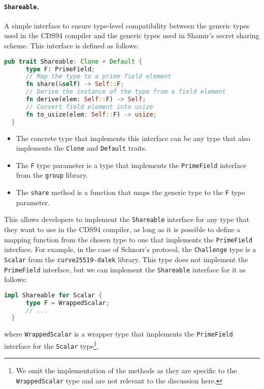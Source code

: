 \paragraph{\texttt{Shareable}.} A simple interface to ensure type-level compatibility between 
the generic types used in the CDS94 compiler and the generic types used in Shamir's secret sharing scheme.
This interface is defined as follows: 
\begin{lstlisting}[language=rust]
  pub trait Shareable: Clone + Default {
      type F: PrimeField;
      // Map the type to a prime field element
      fn share(&self) -> Self::F;
      // Derive the instance of the type from a field element
      fn derive(elem: Self::F) -> Self;
      // Convert field element into usize
      fn to_usize(elem: Self::F) -> usize;
  } 
\end{lstlisting}
\begin{itemize}
  \item The concrete type that implements this interface can be any type that also implements the \texttt{Clone} and
  \texttt{Default} traits. 
  \item The \texttt{F} type parameter is a type that implements the \texttt{PrimeField}
  interface from the \texttt{group} library. 
  \item The \texttt{share} method is a function that maps the generic
  type to the \texttt{F} type parameter.
\end{itemize}

This allows developers to implement the \texttt{Shareable} interface for any type that they want to use in the
CDS94 compiler, as long as it is possible to define a mapping function from the chosen type to one that 
implements the \texttt{PrimeField} interface. 
For example, in the case of Schnorr's protocol, the \texttt{Challenge} type is a \texttt{Scalar}
from the \texttt{curve25519-dalek} library. This type does not implement the \texttt{PrimeField} interface, but
we can implement the \texttt{Shareable} interface for it as follows:
\begin{lstlisting}[language=rust]
  impl Shareable for Scalar {
      type F = WrappedScalar;
      // ...
  }
\end{lstlisting}

where \texttt{WrappedScalar} is a wrapper type that implements the \texttt{PrimeField} interface for the 
\texttt{Scalar} type\footnote{We omit the implementation of the methods as they are specific to the 
\texttt{WrappedScalar} type and are not relevant to the discussion here.}.


